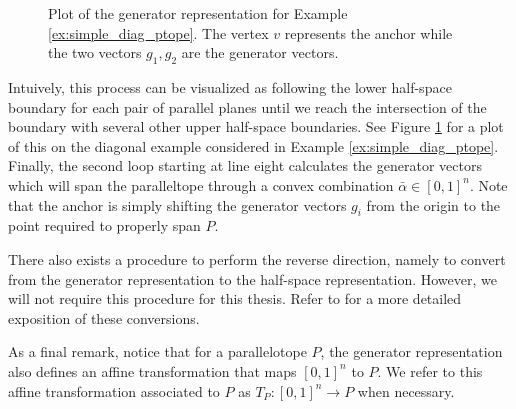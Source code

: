%
\begin{figure}[h!]
  \centering
  \caption{Plot of the generator representation for Example \ref{ex:simple_diag_ptope}. The vertex $v$ represents the anchor while the two vectors $g_1,g_2$ are the generator vectors.}
  \label{fig:axis_align_gen}
\end{figure}
%
Intuively, this process can be visualized as following the lower half-space boundary for each pair of parallel planes until we reach the intersection of the boundary with several other upper half-space boundaries.
%
See Figure \ref{fig:axis_align_gen} for a plot of this on the diagonal example considered in Example \ref{ex:simple_diag_ptope}.
%
Finally, the second loop starting at line eight calculates the generator vectors which will span the paralleltope through a convex combination $\bar{\alpha} \in [0,1]^n$. Note that the anchor is simply shifting the  generator vectors $g_i$ from the origin to the point required to properly span $P$.

There also exists a procedure to perform the reverse direction, namely to convert from the generator representation to the half-space representation. However, we will not require this procedure for this thesis. Refer to \cite{dang2014parameter} for a more detailed exposition of these conversions.

As a final remark, notice that for a parallelotope $P$, the generator representation also defines an affine transformation that maps $[0,1]^{n}$ to $P$.
%
We refer to this affine transformation associated to $P$ as $T_P:[0,1]^n \rightarrow P$ when necessary.



